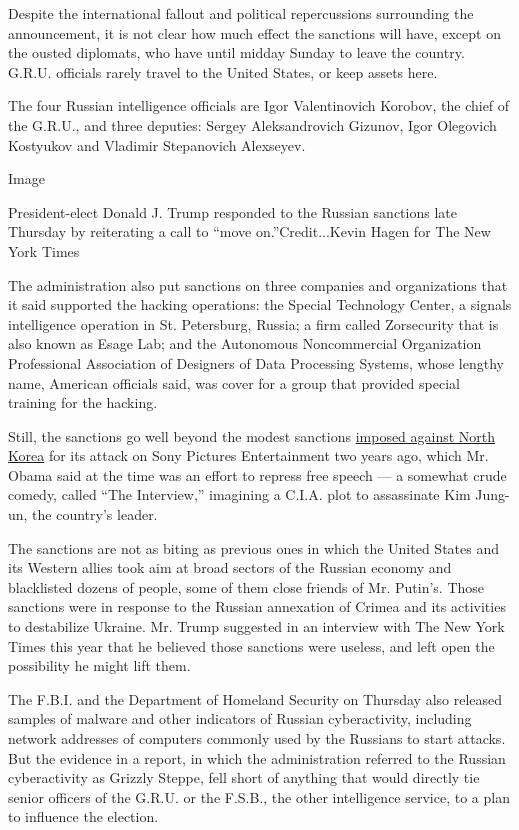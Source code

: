 Despite the international fallout and political repercussions
surrounding the announcement, it is not clear how much effect the
sanctions will have, except on the ousted diplomats, who have until
midday Sunday to leave the country. G.R.U. officials rarely travel to
the United States, or keep assets here.

The four Russian intelligence officials are Igor Valentinovich Korobov,
the chief of the G.R.U., and three deputies: Sergey Aleksandrovich
Gizunov, Igor Olegovich Kostyukov and Vladimir Stepanovich Alexseyev.

Image

President-elect Donald J. Trump responded to the Russian sanctions late
Thursday by reiterating a call to ``move on.''Credit...Kevin Hagen for
The New York Times

The administration also put sanctions on three companies and
organizations that it said supported the hacking operations: the Special
Technology Center, a signals intelligence operation in St. Petersburg,
Russia; a firm called Zorsecurity that is also known as Esage Lab; and
the Autonomous Noncommercial Organization Professional Association of
Designers of Data Processing Systems, whose lengthy name, American
officials said, was cover for a group that provided special training for
the hacking.

Still, the sanctions go well beyond the modest sanctions
\href{http://www.nytimes3xbfgragh.onion/2015/01/03/us/in-response-to-sony-attack-us-levies-sanctions-on-10-north-koreans.html}{imposed
against North Korea} for its attack on Sony Pictures Entertainment two
years ago, which Mr. Obama said at the time was an effort to repress
free speech --- a somewhat crude comedy, called ``The Interview,''
imagining a C.I.A. plot to assassinate Kim Jung-un, the country's
leader.

The sanctions are not as biting as previous ones in which the United
States and its Western allies took aim at broad sectors of the Russian
economy and blacklisted dozens of people, some of them close friends of
Mr. Putin's. Those sanctions were in response to the Russian annexation
of Crimea and its activities to destabilize Ukraine. Mr. Trump suggested
in an interview with The New York Times this year that he believed those
sanctions were useless, and left open the possibility he might lift
them.

The F.B.I. and the Department of Homeland Security on Thursday also
released samples of malware and other indicators of Russian
cyberactivity, including network addresses of computers commonly used by
the Russians to start attacks. But the evidence in a report, in which
the administration referred to the Russian cyberactivity as Grizzly
Steppe, fell short of anything that would directly tie senior officers
of the G.R.U. or the F.S.B., the other intelligence service, to a plan
to influence the election.

